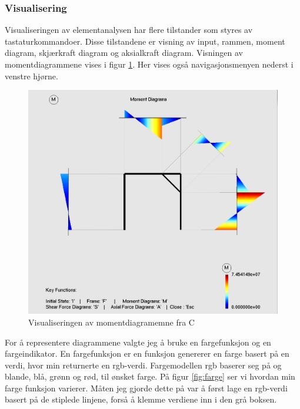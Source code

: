 \documentclass[10pt,a4paper, norsk]{article}
\begin{document}
\subsubsection{Visualisering}
Visualiseringen av elementanalysen har flere tilstander som styres av tastaturkommandoer. Disse tilstandene er visning av input, rammen, moment diagram, skjærkraft diagram og aksialkraft diagram. Visningen av momentdiagrammene vises i figur \ref{fig:momenD}. Her vises også navigasjonsmenyen nederst i venstre hjørne.


\begin{figure}[h] 
\centering
\includegraphics[scale=0.26]{momentdiagram.png} 
\caption{Visualiseringen av momentdiagramemne fra C}
\label{fig:momenD}
\end{figure} 


For å representere diagrammene valgte jeg å bruke en fargefunksjon og en fargeindikator. En fargefunksjon er en funksjon genererer en farge basert på en verdi, hvor min returnerte en rgb-verdi. Fargemodellen rgb baserer seg på og blande, blå, grønn og rød, til ønsket farge. På figur \ref{fig:farge} ser vi hvordan min farge funksjon varierer. Måten jeg gjorde dette på var å først lage en rgb-verdi basert på de stiplede linjene, forså å klemme verdiene inn i den grå boksen.
\end{document}
